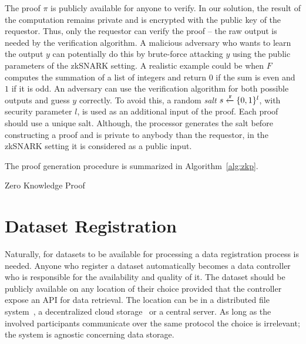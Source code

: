 The proof $\pi$ is publicly available for anyone to verify. In our solution, the result of the computation remains private and is encrypted with the public key of the requestor. Thus, only the requestor can verify the proof -- the raw output is needed by the verification algorithm. A malicious adversary who wants to learn the output $y$ can potentially do this by brute-force attacking $y$ using the public parameters of the zkSNARK setting. A realistic example could be when $F$ computes the summation of a list of integers and return $0$ if the sum is even and $1$ if it is odd. An adversary can use the verification algorithm for both possible outputs and guess $y$ correctly. To avoid this, a random \textit{salt} $s \xleftarrow{\mathtt{r}}{\{0, 1\}^{l}}$, with security parameter $l$, is used as an additional input of the proof. Each proof should use a unique salt. Although, the processor generates the salt before constructing a proof and is private to anybody than the requestor, in the zkSNARK setting it is considered as a public input.

The proof generation procedure is summarized in Algorithm~\ref{alg:zkp}.

\begin{algorithm}[!htb]
  \caption{Zero Knowledge Proof}\label{alg:zkp}
  \begin{algorithmic}[1]
     
     
    \State {} 
  \EndFunction
     
     
  \EndProcedure
  \end{algorithmic}
\end{algorithm}

\section{Dataset Registration}
\label{solution:flow:reg_data}

Naturally, for datasets to be available for processing a data registration process is needed. Anyone who register a dataset automatically becomes a data controller who is responsible for the availability and quality of it. The dataset should be publicly available on any location of their choice provided that the controller expose an API for data retrieval. The location can be in a distributed file system~\cite{ipfs}, a decentralized cloud storage~\cite{storj} or a central server. As long as the involved participants communicate over the same protocol the choice is irrelevant; the system is agnostic concerning data storage.


